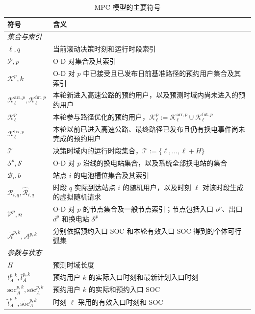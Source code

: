 \documentclass[12pt,a4paper,UTF8]{ctexart}
\begin{document}
\begin{table}[!htbp]
  \centering
  \caption{MPC 模型的主要符号}
  \label{tab:notation}
  \scriptsize
  \setlength{\tabcolsep}{2pt}
  \renewcommand{\arraystretch}{0.88}
  \begin{tabular}{@{}lp{13cm}@{}}
    \toprule
    \textbf{符号} & \textbf{含义} \\
    \midrule
    \multicolumn{2}{l}{\textit{集合与索引}} \\
    $\ell,q$ & 当前滚动决策时刻和运行时段索引 \\
    $\mathcal{P},p$ & O-D 对集合及其索引 \\
    $\mathcal{K}^{p},k$ & O-D 对 $p$ 中已接受且已发布日前基准路径的预约用户集合及其索引 \\
    $\mathcal{K}_{\ell}^{\mathrm{arr},p},\mathcal{K}_{\ell}^{\mathrm{fut},p}$ & 本轮新进入高速公路的预约用户，以及预测时域内尚未进入的预约用户 \\
    $\mathcal{K}_{\ell}^{p}$ & 本轮参与路径优化的预约用户，$\mathcal{K}_{\ell}^{p}:=\mathcal{K}_{\ell}^{\mathrm{arr},p}\cup\mathcal{K}_{\ell}^{\mathrm{fut},p}$ \\
    $\mathcal{K}_{\ell}^{\mathrm{fix},p}$ & 本轮以前已进入高速公路、最终路径已发布且仍有换电事件尚未完成的预约用户 \\
    $\mathcal{T}$ & 决策时域内的运行时段集合，$\mathcal{T}:=\{\ell,\ldots,\ell+H\}$ \\
    $\mathcal{S}^{p},\mathcal{S}$ & O-D 对 $p$ 沿线的换电站集合，以及系统全部换电站的集合 \\
    $\mathcal{B}_{i},b$ & 站点 $i$ 的电池槽位集合及其索引 \\
    $\mathcal R_{i,q},\widehat{\mathcal R}_{i,q}$ & 时段 $q$ 实际到达站点 $i$ 的随机用户，以及时刻 $\ell$ 对该时段生成的虚拟随机请求 \\
    $\mathcal{V}^{p},n$ & O-D 对 $p$ 的节点集合及一般节点索引；节点包括入口 $o^p$、出口 $d^p$ 和换电站 $\mathcal S^p$ \\
    $\bar{\mathcal A}^{p,k},\mathcal A^{p,k}$ & 分别依据预约入口 SOC 和本轮有效入口 SOC 得到的个体可行弧集 \\
    \midrule
    \multicolumn{2}{l}{\textit{参数与状态}} \\
    $H$ & 预测时域长度 \\
    $t_A^{p,k},\bar t_A^{p,k}$ & 预约用户 $k$ 的实际入口时刻和最新计划入口时刻 \\
    $\mathrm{soc}_A^{p,k},\overline{\mathrm{soc}}_A^{p,k}$ & 预约用户 $k$ 的实际和预约入口 SOC \\
    $\widetilde t_{A}^{p,k},\widetilde{\mathrm{soc}}_{A}^{p,k}$ & 时刻 $\ell$ 采用的有效入口时刻和 SOC \\

\end{tabular}
\end{table}
\end{document}
